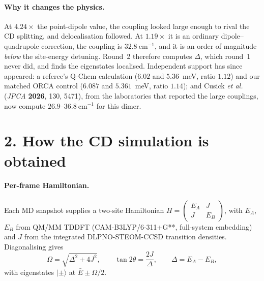 \documentclass[11pt,a4paper]{article}
\begin{document}
\paragraph{Why it changes the physics.} At $4.24\times$ the point-dipole value,
the coupling looked large enough to rival the CD splitting, and delocalisation
followed. At $1.19\times$ it is an ordinary dipole--quadrupole correction, the
coupling is $32.8~\mathrm{cm^{-1}}$, and it is an order of magnitude
\emph{below} the site-energy detuning. Round~2 therefore computes $\Delta$,
which round~1 never did, and finds the eigenstates localised. Independent
support has since appeared: a referee's Q-Chem calculation
($6.02$ and $5.36$~meV, ratio $1.12$) and our matched ORCA control
($6.087$ and $5.361$~meV, ratio $1.14$); and Cusick \emph{et al.} (\emph{JPCA}
\textbf{2026}, 130, 5471), from the laboratories that reported the large
couplings, now compute $26.9$--$36.8~\mathrm{cm^{-1}}$ for this dimer.

\section*{2. How the CD simulation is obtained}

\paragraph{Per-frame Hamiltonian.} Each MD snapshot supplies a two-site
Hamiltonian $H = \begin{pmatrix} E_A & J \\ J & E_B\end{pmatrix}$, with $E_A$,
$E_B$ from QM/MM TDDFT (CAM-B3LYP/6-311+G**, full-system embedding) and $J$ from
the integrated DLPNO-STEOM-CCSD transition densities. Diagonalising gives
\begin{equation}
\Omega = \sqrt{\Delta^{2}+4J^{2}}, \qquad
\tan 2\theta = \frac{2J}{\Delta}, \qquad \Delta = E_A - E_B ,
\end{equation}
with eigenstates $|\pm\rangle$ at $\bar{E} \pm \Omega/2$.
\end{document}
